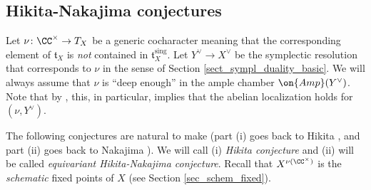 \documentclass[12pt]{amsart}
\begin{document}
\subsection{Hikita-Nakajima conjectures} \label{section Hikita general}
Let $\nu\colon \CC^\times \rightarrow T_X$ be a generic cocharacter meaning that the corresponding element of $\mathfrak{t}_X$ is {\emph{not}} contained in $\mathfrak{t}_X^{\mathrm{sing}}$. Let $Y^\vee \rightarrow X^\vee$ be the symplectic resolution that corresponds to $\nu$ in the sense of Section \ref{sect_sympl_duality_basic}.
We will always assume that $\nu$ is ``deep enough'' in the ample chamber $\on{Amp}(Y^\vee)$. Note that by \cite[Corollary B.1]{BPW}, this, in particular, implies that the abelian localization holds for $(\nu,Y^\vee)$.

The following conjectures are natural to make (part (i) goes back to Hikita \cite{Hikita}, and part (ii) goes back to Nakajima \cite[Section 5.6]{Kamnitzer_symplectic}). We will call (i) {\emph{Hikita conjecture}} and (ii) will be called {\emph{equivariant Hikita-Nakajima conjecture}}. Recall that $X^{\nu(\CC^\times)}$ is the {\em{schematic}} fixed points of $X$ (see Section \ref{sec_schem_fixed}).
\end{document}
